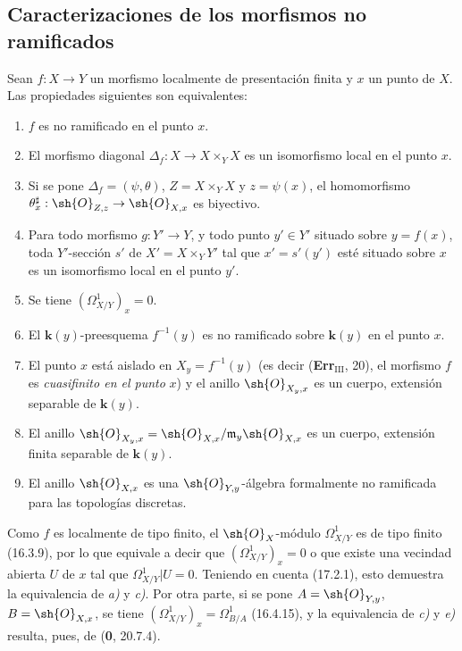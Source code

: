 \subsection{Caracterizaciones de los morfismos no ramificados}
\label{subsection:IV.17.4}

\begin{theorem}[17.4.1]
\label{IV.17.4.1}
Sean $f:X\to Y$ un morfismo localmente de presentación finita y $x$ un punto de $X$. Las propiedades siguientes son equivalentes:
\begin{enumerate}
  \item[\textup{a)}] $f$ es no ramificado en el punto $x$.
  \item[\textup{b)}] El morfismo diagonal $\Delta_f:X\to X\times_Y X$ es un isomorfismo local en el punto $x$.
  \item[\textup{b$'$)}] Si se pone $\Delta_f=(\psi,\theta)$, $Z=X\times_Y X$ y $z=\psi(x)$, el homomorfismo $\theta_x^\sharp:\sh{O}_{Z,z}\to\sh{O}_{X,x}$ es biyectivo.
  \item[\textup{b$''$)}] Para todo morfismo $g:Y'\to Y$, y todo punto $y'\in Y'$ situado sobre $y=f(x)$, toda $Y'$-sección $s'$ de $X'=X\times_Y Y'$ tal que $x'=s'(y')$ esté situado sobre $x$ es un isomorfismo local en el punto $y'$.
  \item[\textup{c)}] Se tiene $(\varOmega^1_{X/Y})_x=0$.
  \item[\textup{d)}] El $\boldsymbol{k}(y)$-preesquema $f^{-1}(y)$ es no ramificado sobre $\boldsymbol{k}(y)$ en el punto $x$.
  \item[\textup{d$'$)}] El punto $x$ está aislado en $X_y=f^{-1}(y)$ \textup{(es decir (\textbf{Err}$_{\mathrm{III}}$, 20), el morfismo $f$ es \emph{cuasifinito en el punto} $x$)} y el anillo $\sh{O}_{X_y,x}$ es un cuerpo, extensión separable de $\boldsymbol{k}(y)$.
  \item[\textup{d$''$)}] El anillo $\sh{O}_{X_y,x}=\sh{O}_{X,x}/\mathfrak{m}_y\sh{O}_{X,x}$ es un cuerpo, extensión finita separable de $\boldsymbol{k}(y)$.
  \item[\textup{e)}] El anillo $\sh{O}_{X,x}$ es una $\sh{O}_{Y,y}$-álgebra formalmente no ramificada para las topologías discretas.
\end{enumerate}
\end{theorem}

Como $f$ es localmente de tipo finito, el $\sh{O}_X$-módulo $\varOmega^1_{X/Y}$ es de tipo finito (16.3.9), por lo que equivale a decir que $(\varOmega^1_{X/Y})_x=0$ o que existe una vecindad abierta $U$ de $x$ tal que $\varOmega^1_{X/Y}|U=0$. Teniendo en cuenta (17.2.1), esto demuestra la equivalencia de \emph{a)} y \emph{c)}. Por otra parte, si se pone $A=\sh{O}_{Y,y}$, $B=\sh{O}_{X,x}$, se tiene $(\varOmega^1_{X/Y})_x=\Omega^1_{B/A}$ (16.4.15), y la equivalencia de \emph{c)} y \emph{e)} resulta, pues, de (\textbf 0, 20.7.4).

